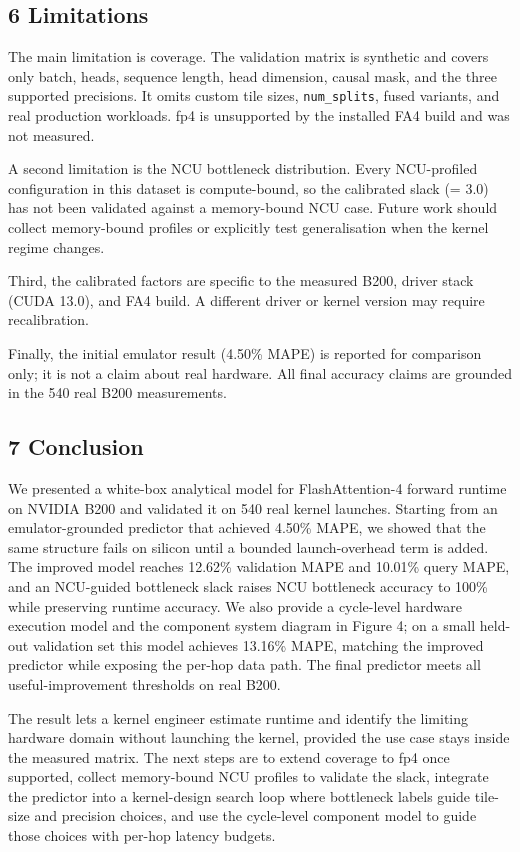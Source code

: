 \subsection{6 Limitations}\label{limitations}

The main limitation is coverage. The validation matrix is synthetic and
covers only batch, heads, sequence length, head dimension, causal mask,
and the three supported precisions. It omits custom tile sizes,
\texttt{num\_splits}, fused variants, and real production workloads. fp4
is unsupported by the installed FA4 build and was not measured.

A second limitation is the NCU bottleneck distribution. Every
NCU-profiled configuration in this dataset is compute-bound, so the
calibrated slack (\gamma = 3.0) has not been validated against a
memory-bound NCU case. Future work should collect memory-bound profiles
or explicitly test generalisation when the kernel regime changes.

Third, the calibrated factors are specific to the measured B200, driver
stack (CUDA 13.0), and FA4 build. A different driver or kernel version
may require recalibration.

Finally, the initial emulator result (4.50\% MAPE) is reported for
comparison only; it is not a claim about real hardware. All final
accuracy claims are grounded in the 540 real B200 measurements.

\subsection{7 Conclusion}\label{conclusion}

We presented a white-box analytical model for FlashAttention-4 forward
runtime on NVIDIA B200 and validated it on 540 real kernel launches.
Starting from an emulator-grounded predictor that achieved 4.50\% MAPE,
we showed that the same structure fails on silicon until a bounded
launch-overhead term is added. The improved model reaches 12.62\%
validation MAPE and 10.01\% query MAPE, and an NCU-guided bottleneck
slack raises NCU bottleneck accuracy to 100\% while preserving runtime
accuracy. We also provide a cycle-level hardware execution model and the
component system diagram in Figure 4; on a small held-out validation set
this model achieves 13.16\% MAPE, matching the improved predictor while
exposing the per-hop data path. The final predictor meets all
useful-improvement thresholds on real B200.

The result lets a kernel engineer estimate runtime and identify the
limiting hardware domain without launching the kernel, provided the use
case stays inside the measured matrix. The next steps are to extend
coverage to fp4 once supported, collect memory-bound NCU profiles to
validate the slack, integrate the predictor into a kernel-design search
loop where bottleneck labels guide tile-size and precision choices, and
use the cycle-level component model to guide those choices with per-hop
latency budgets.

